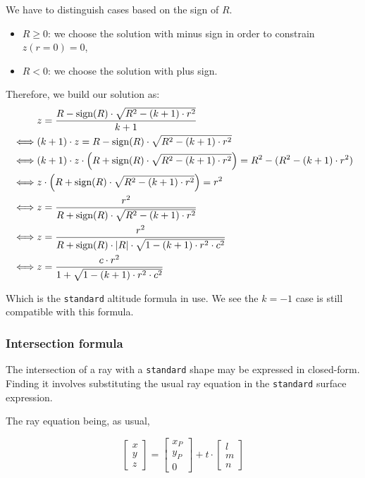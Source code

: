We have to distinguish cases based on the sign of $R$.
\begin{itemize}
\item $R \geq 0$: we choose the solution with minus sign in order to constrain
                  $z(r=0)=0$,
\item $R < 0$: we choose the solution with plus sign.
\end{itemize}

Therefore, we build our solution as:
\begin{equation} \begin{split}
& z = \frac{R - \textrm{sign}(R) \cdot \sqrt{R^2 - (k+1) \cdot r^2}}{k+1} \\
\iff & (k+1) \cdot z = R - \textrm{sign}(R) \cdot \sqrt{R^2 - (k+1) \cdot r^2}\\
\iff & (k+1) \cdot z \cdot \left( R + \textrm{sign}(R) \cdot
       \sqrt{R^2 - (k+1) \cdot r^2} \right) = R^2 - (R^2 - (k+1) \cdot r^2) \\
\iff & z \cdot \left( R + \textrm{sign}(R) \cdot
       \sqrt{R^2 - (k+1) \cdot r^2} \right) = r^2 \\
\iff & z = \frac{r^2}{R + \textrm{sign}(R) \cdot \sqrt{R^2 - (k+1) \cdot r^2}}\\
\iff & z = \frac{r^2}{R + \textrm{sign}(R) \cdot \abs{R} \cdot
                      \sqrt{1 - (k+1) \cdot r^2 \cdot c^2}} \\
\iff & z = \frac{c \cdot r^2}{1 + \sqrt{1 - (k+1) \cdot r^2 \cdot c^2}}
\end{split} \end{equation}

Which is the \lstinline{standard} altitude formula in use. We see the $k=-1$
case is still compatible with this formula.

\subsubsection{Intersection formula}
The intersection of a ray with a \lstinline{standard} shape may be expressed
in closed-form. Finding it involves substituting the usual ray equation in
the \lstinline{standard} surface expression.

The ray equation being, as usual,

\begin{equation}
\begin{bmatrix} x \\ y \\ z \end{bmatrix} =
\begin{bmatrix} x_P \\ y_P \\ 0 \end{bmatrix} + t \cdot
\begin{bmatrix} l \\ m \\ n \end{bmatrix}
\end{equation}

